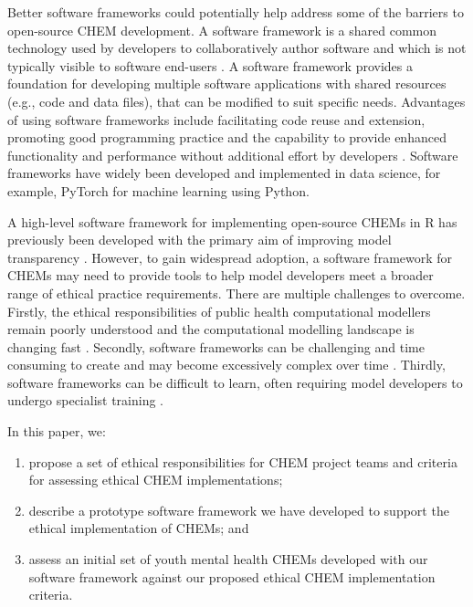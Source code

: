 \documentclass[sn-vancouver,Numbered,pdflatex]{sn-jnl}
\theoremstyle{remark}
\theoremstyle{definition}
\begin{document}
Better software frameworks could potentially help address some of the barriers to open-source CHEM development. A software framework is a shared common technology used by developers to collaboratively author software and which is not typically visible to software end-users \citep{myllarniemi2018development}. A software framework provides a foundation for developing multiple software applications with shared resources (e.g., code and data files), that can be modified to suit specific needs. Advantages of using software frameworks include facilitating code reuse and extension, promoting good programming practice and the capability to provide enhanced functionality and performance without additional effort by developers \citep{edwin2014software}. Software frameworks have widely been developed and implemented in data science, for example, PyTorch \citep{PyTorch2019} for machine learning using Python.

A high-level software framework for implementing open-source CHEMs in R has previously been developed with the primary aim of improving model transparency \citep{alarid2019need}. However, to gain widespread adoption, a software framework for CHEMs may need to provide tools to help model developers meet a broader range of ethical practice requirements. There are multiple challenges to overcome. Firstly, the ethical responsibilities of public health computational modellers remain poorly understood \citep{10.3389/fpubh.2017.00068} and the computational modelling landscape is changing fast \citep{calder2018computational}. Secondly, software frameworks can be challenging and time consuming to create and may become excessively complex over time \citep{edwin2014software}. Thirdly, software frameworks can be difficult to learn, often requiring model developers to undergo specialist training \citep{myllarniemi2018development}.

In this paper, we:

\begin{enumerate}
\def\labelenumi{(\roman{enumi})}
\item
  propose a set of ethical responsibilities for CHEM project teams and criteria for assessing ethical CHEM implementations;
\item
  describe a prototype software framework we have developed to support the ethical implementation of CHEMs; and
\item
  assess an initial set of youth mental health CHEMs developed with our software framework against our proposed ethical CHEM implementation criteria.
\end{enumerate}
\end{document}
